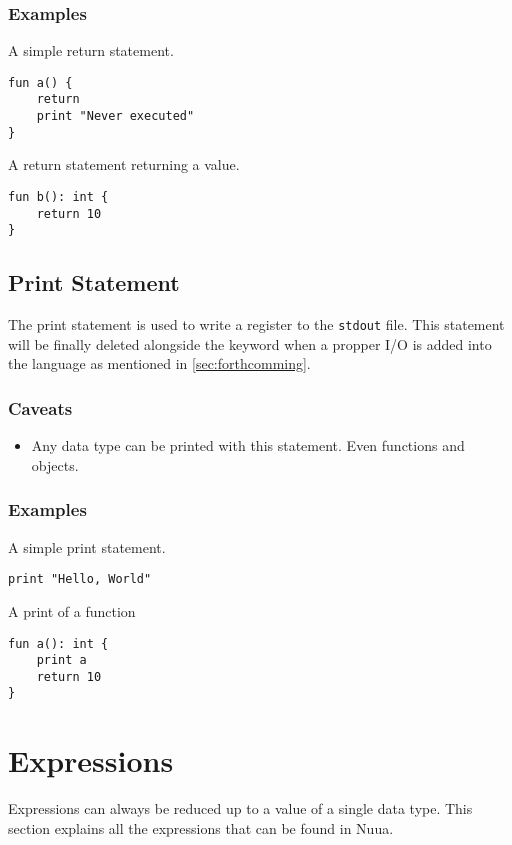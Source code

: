 \subsubsection{Examples}

A simple return statement.
\begin{lstlisting}
fun a() {
    return
    print "Never executed"
}
\end{lstlisting}
A return statement returning a value.
\begin{lstlisting}
fun b(): int {
    return 10
}
\end{lstlisting}

\subsection{Print Statement}
\label{sec:print_statement}

The print statement is used to write a register to the \texttt{stdout} file.
This statement will be finally deleted alongside the keyword when a propper I/O is added into the language as mentioned in \autoref{sec:forthcomming}.

\subsubsection{Caveats}

\begin{itemize}
    \item Any data type can be printed with this statement. Even functions and objects.
\end{itemize}

\subsubsection{Examples}

A simple print statement.
\begin{lstlisting}
print "Hello, World"
\end{lstlisting}
A print of a function
\begin{lstlisting}
fun a(): int {
    print a
    return 10
}
\end{lstlisting}

\section{Expressions}

Expressions can always be reduced up to a value of a single data type. This section explains all the expressions that can be found
in Nuua.

